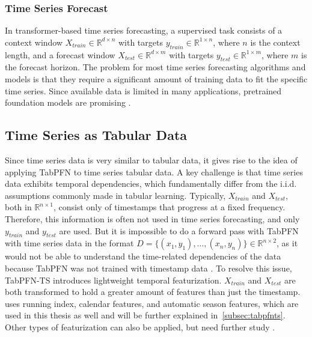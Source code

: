 \subsubsection{Time Series Forecast}
In transformer-based time series forecasting, a supervised task consists of a context window $X_{train} \in \mathbb{R}^{d \times n}$ with targets $y_{train} \in \mathbb{R}^{1 \times n}$, where $n$ is the context length, and a forecast window $X_{test} \in \mathbb{R}^{d \times m}$ with targets $y_{test} \in \mathbb{R}^{1 \times m}$, where $m$ is the forecast horizon.
The problem for most time series forecasting algorithms and models is that they require a significant amount of training data to fit the specific time series.
Since available data is limited in many applications, pretrained foundation models are promising \citep{wang2024deep}.
\subsection{Time Series as Tabular Data}
\label{subsec:time_series_as_tabular}
Since time series data is very similar to tabular data, it gives rise to the idea of applying TabPFN to time series tabular data.
A key challenge is that time series data exhibits temporal dependencies, which fundamentally differ from the i.i.d. assumptions commonly made in tabular learning.
Typically, $X_{train}$ and $X_{test}$, both in $\mathbb{R}^{n \times 1}$, consist only of timestamps that progress at a fixed frequency.
Therefore, this information is often not used in time series forecasting, and only $y_{train}$ and $y_{test}$ are used.
But it is impossible to do a forward pass with TabPFN with time series data in the format $D = \{(x_1, y_1),…,(x_n, y_n)\} \in \mathbb{R}^{n \times 2}$, as it would not be able to understand the time-related dependencies of the data because TabPFN was not trained with timestamp data \citep{hollmann2025accurate}. %
To resolve this issue, TabPFN-TS introduces lightweight temporal featurization.
$X_{train}$ and $X_{test}$ are both transformed to hold a greater amount of features than just the timestamp.
\citet{hoo2025tables} uses running index, calendar features, and automatic season features, which are used in this thesis as well and will be further explained in~\ref{subsec:tabpfnts}.
Other types of featurization can also be applied, but need further study \citep{hoo2025tables}.

